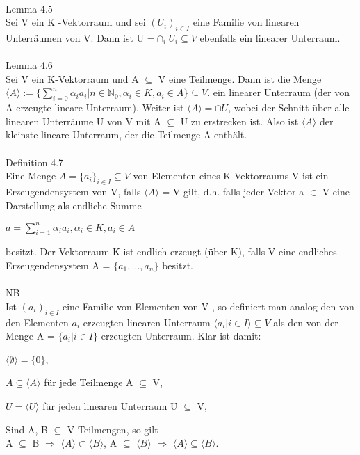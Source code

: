 \\
Lemma 4.5\\
Sei V ein K -Vektorraum und sei $(U_i )_{i \in I}$ eine Familie von linearen Unterräumen von V. Dann ist U =$\cap_i U_i \subseteq V$ ebenfalls ein linearer Unterraum. \\
\\
Lemma 4.6\\
Sei V ein K-Vektorraum und A $\subseteq$ V eine Teilmenge. Dann ist die Menge $\langle A \rangle := \big\{ \sum\nolimits_{i=0}^{n} \alpha_i a_i | n \in \mathbb{N}_0, \alpha_i \in K, a_i \in A \big\} \subseteq V$.
ein linearer Unterraum (der von A erzeugte lineare Unterraum). Weiter ist $\langle A \rangle = \cap U$, wobei der Schnitt über alle linearen Unterräume U von V mit A $\subseteq$ U zu erstrecken ist. Also ist $\langle A \rangle$ der kleinste lineare Unterraum, der die Teilmenge A enthält.\\
\\
Definition 4.7\\
Eine Menge $A = \{a_i\}_{i \in I} \subseteq V$ von Elementen eines K-Vektorraums V ist ein Erzeugendensystem von V, falls $\langle A \rangle$ = V gilt, d.h. falls jeder Vektor a $\in$ V eine Darstellung als endliche Summe
\begin{center}
$a = \sum\nolimits_{i=1}^{n}\alpha_i a_i, \alpha_i \in K, a_i \in A$
\end{center}
besitzt. Der Vektorraum K ist endlich erzeugt (über K), falls V eine endliches Erzeugendensystem A = $\{a_1, …, a_n\}$ besitzt.\\
\\
NB\\
Ist $(a_i)_{i \in I}$ eine Familie von Elementen von V , so definiert man analog den von den Elementen $a_i$ erzeugten linearen Unterraum $\langle a_i | i \in I \rangle \subseteq V$ als den von der Menge A = $\{a_i | i \in I\}$ erzeugten Unterraum. Klar ist 
damit:
\begin{compactitem}
\item $\langle \emptyset \rangle = \{0\}$,
\item $A \subseteq \langle A \rangle$ für jede Teilmenge A $\subseteq$ V, 
\item $U = \langle U \rangle$ für jeden linearen Unterraum U $\subseteq$ V, 
\item Sind A, B $\subseteq$ V Teilmengen, so gilt\\ 
A $\subseteq$ B $\Rightarrow$ $\langle A \rangle \subset \langle B \rangle$, \hspace*{3mm}
A $\subseteq$ $\langle B \rangle$ $\Rightarrow$ $\langle A \rangle \subseteq \langle B \rangle$.\\
\end{compactitem} 
